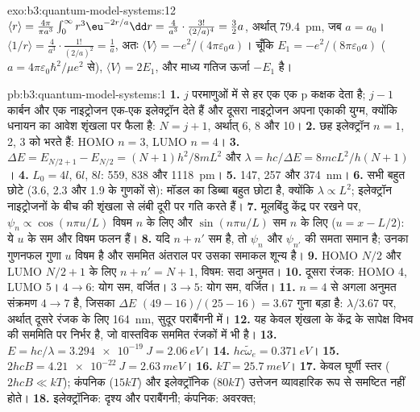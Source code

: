 \begin{solution}{exo:b3:quantum-model-systems:12}
$\langle r\rangle = \frac{4\pi}{\pi a^3}\int_0^\infty r^3\eu^{-2r/a}\dd r =
\frac{4}{a^3}\cdot\frac{3!}{(2/a)^4} = \frac32a$, अर्थात् \qty{79.4}{pm}, जब $a = a_0$।
$\langle 1/r\rangle = \frac{4}{a^3}\cdot\frac{1!}{(2/a)^2} = \frac1a$, अतः
$\langle V\rangle = -e^2/(4\pi\varepsilon_0a)$। चूँकि $E_1 =
-e^2/(8\pi\varepsilon_0a)$ ($a = 4\pi\varepsilon_0\hbar^2/\mu e^2$ से),
$\langle V\rangle = 2E_1$, और माध्य गतिज ऊर्जा $-E_1$ है।
\end{solution}

\begin{solution}{pb:b3:quantum-model-systems:1}
\textbf{1.} $j$ परमाणुओं में से हर एक एक p कक्षक देता है; $j - 1$ कार्बन और
एक नाइट्रोजन एक-एक इलेक्ट्रॉन देते हैं और दूसरा नाइट्रोजन अपना एकाकी युग्म,
क्योंकि धनायन का आवेश शृंखला पर फैला है: $N = j + 1$, अर्थात् 6,
8 और 10।
\textbf{2.} छह इलेक्ट्रॉन $n = 1$, 2, 3 को भरते हैं: HOMO $n = 3$, LUMO $n = 4$।
\textbf{3.} $\Delta E = E_{N/2+1} - E_{N/2} = (N+1)h^2/8mL^2$ और $\lambda =
hc/\Delta E = 8mcL^2/h(N+1)$।
\textbf{4.} $L_0 = 4l$, $6l$, $8l$: 559, 838 और \qty{1118}{pm}।
\textbf{5.} 147, 257 और \qty{374}{nm}।
\textbf{6.} सभी बहुत छोटे (3.6, 2.3 और 1.9 के गुणकों से): मॉडल का डिब्बा बहुत
छोटा है, क्योंकि $\lambda \propto L^2$; इलेक्ट्रॉन नाइट्रोजनों के बीच की शृंखला से
लंबी दूरी पर गति करते हैं।
\textbf{7.} मूलबिंदु केंद्र पर रखने पर, $\psi_n \propto \cos(n\pi u/L)$
विषम $n$ के लिए और $\sin(n\pi u/L)$ सम $n$ के लिए ($u = x - L/2$): ये
$u$ के सम और विषम फलन हैं।
\textbf{8.} यदि $n + n'$ सम है, तो $\psi_n$ और $\psi_{n'}$ की समता समान है;
उनका गुणनफल गुणा $u$ विषम है और सममित अंतराल पर उसका
समाकल शून्य है।
\textbf{9.} HOMO $N/2$ और LUMO $N/2 + 1$ के लिए $n + n' = N + 1$, विषम: सदा
अनुमत।
\textbf{10.} दूसरा रंजक: HOMO 4, LUMO 5। $4 \to 6$: योग सम, वर्जित।
$3 \to 5$: योग सम, वर्जित।
\textbf{11.} $n = 4$ से अगला अनुमत संक्रमण $4 \to 7$ है, जिसका
$\Delta E$ $(49 - 16)/(25 - 16) = 3.67$ गुना बड़ा है: $\lambda/3.67$ पर, अर्थात्
दूसरे रंजक के लिए \qty{164}{nm}, सुदूर पराबैंगनी में।
\textbf{12.} यह केवल शृंखला के केंद्र के सापेक्ष विभव की सममिति पर निर्भर है,
जो वास्तविक सममित रंजकों में भी है।
\textbf{13.} $E = hc/\lambda = \qty{3.294e-19}{J} = \qty{2.06}{eV}$।
\textbf{14.} $hc\tilde\omega_e = \qty{0.371}{eV}$।
\textbf{15.} $2hcB = \qty{4.21e-22}{J} = \qty{2.63}{meV}$।
\textbf{16.} $kT = \qty{25.7}{meV}$।
\textbf{17.} केवल घूर्णी स्तर ($2hcB \ll kT$); कंपनिक ($15kT$) और
इलेक्ट्रॉनिक ($80kT$) उत्तेजन व्यावहारिक रूप से समष्टित नहीं होते।
\textbf{18.} इलेक्ट्रॉनिक: दृश्य और पराबैंगनी; कंपनिक: अवरक्त;

\end{solution}
